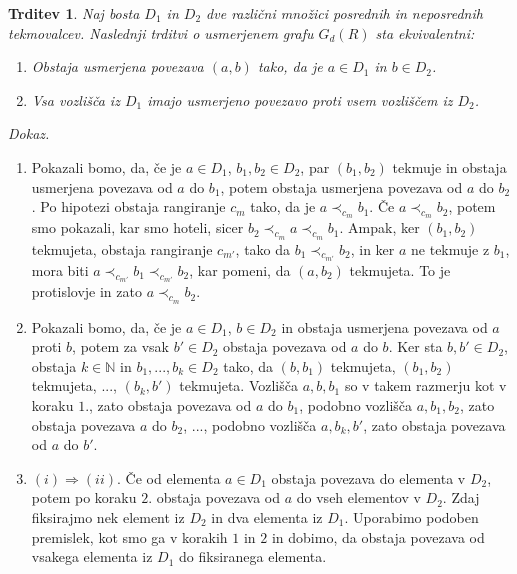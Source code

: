 \documentclass[a4paper, 12pt]{book}
\newtheorem{trditev}{Trditev}[chapter]
\newenvironment{dokaz}{\emph{Dokaz.}\ }{\hspace{\fill}{$\Box$}}
\begin{document}
\begin{trditev}
\label{trditev_ekvivalenc_mnozic_posrednih_tekmovalcev}
    Naj bosta $D_1$ in $D_2$ dve različni množici posrednih in neposrednih tekmovalcev. Naslednji trditvi o usmerjenem grafu $G_d(R)$ sta ekvivalentni:
    \begin{enumerate}[label=(\roman*)]
        \item Obstaja usmerjena povezava $(a, b)$ tako, da je $a \in D_1$ in $b \in D_2$.
        \item Vsa vozlišča iz $D_1$ imajo usmerjeno povezavo proti vsem vozliščem iz $D_2$.
    \end{enumerate}
\end{trditev}
\begin{dokaz}
    \begin{enumerate}
        \item Pokazali bomo, da, če je $a \in D_1$, $b_1, b_2 \in D_2$, par $(b_1, b_2)$ tekmuje in obstaja usmerjena povezava od $a$ do $b_1$, potem obstaja usmerjena povezava od $a$ do $b_2$. Po hipotezi obstaja rangiranje $c_m$ tako, da je $a \prec_{c_m} b_1$. Če $a \prec_{c_m} b_2$, potem smo pokazali, kar smo hoteli, sicer $b_2 \prec_{c_m} a \prec_{c_m} b_1$. Ampak, ker $(b_1, b_2)$ tekmujeta, obstaja rangiranje $c_{m'}$, tako da $b_1 \prec_{c_{m'}} b_2$, in ker $a$ ne tekmuje z $b_1$, mora biti $a \prec_{c_{m'}} b_1 \prec_{c_{m'}} b_2$, kar pomeni, da $(a, b_2)$ tekmujeta. To je protislovje in zato $a \prec_{c_m} b_2$.
        \item Pokazali bomo, da, če je $a \in D_1$, $b \in D_2$ in obstaja usmerjena povezava od $a$ proti $b$, potem za vsak $b' \in D_2$ obstaja povezava od $a$ do $b$. Ker sta $b, b' \in D_2$, obstaja $k \in \mathbb{N}$ in $b_1, ..., b_k \in D_2$ tako, da $(b, b_1)$ tekmujeta, $(b_1, b_2)$ tekmujeta, ..., $(b_k, b')$ tekmujeta. Vozlišča $a, b, b_1$ so v takem razmerju kot v koraku $1.$, zato obstaja povezava od $a$ do $b_1$, podobno vozlišča $a, b_1, b_2$, zato obstaja povezava $a$ do $b_2$, ..., podobno vozlišča $a, b_k, b'$, zato obstaja povezava od $a$ do $b'$.
        \item $(i) \Rightarrow (ii)$. Če od elementa $a \in D_1$ obstaja povezava do elementa v $D_2$, potem po koraku $2.$ obstaja povezava od $a$ do vseh elementov v $D_2$. Zdaj fiksirajmo nek element iz $D_2$ in dva elementa iz $D_1$. Uporabimo podoben premislek, kot smo ga v korakih $1$ in $2$ in dobimo, da obstaja povezava od vsakega elementa iz $D_1$ do fiksiranega elementa.
    \end{enumerate}
\end{dokaz}
\end{document}
